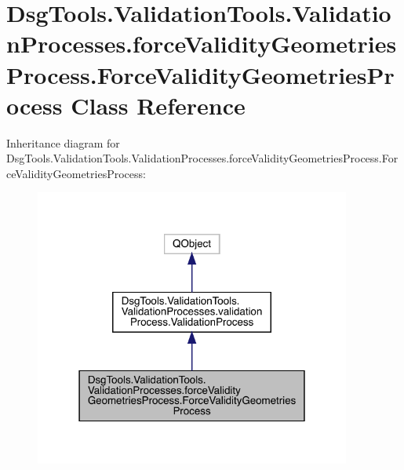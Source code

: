 \hypertarget{class_dsg_tools_1_1_validation_tools_1_1_validation_processes_1_1force_validity_geometries_proceb6c6e9dee7ed1346c8f2b65740bae4ad}{}\section{Dsg\+Tools.\+Validation\+Tools.\+Validation\+Processes.\+force\+Validity\+Geometries\+Process.\+Force\+Validity\+Geometries\+Process Class Reference}
\label{class_dsg_tools_1_1_validation_tools_1_1_validation_processes_1_1force_validity_geometries_proceb6c6e9dee7ed1346c8f2b65740bae4ad}


Inheritance diagram for Dsg\+Tools.\+Validation\+Tools.\+Validation\+Processes.\+force\+Validity\+Geometries\+Process.\+Force\+Validity\+Geometries\+Process\+:
\nopagebreak
\begin{figure}[H]
\begin{center}
\leavevmode
\includegraphics[width=295pt]{class_dsg_tools_1_1_validation_tools_1_1_validation_processes_1_1force_validity_geometries_procec992d49f5623e8c930261f758609d2fd}
\end{center}
\end{figure}


